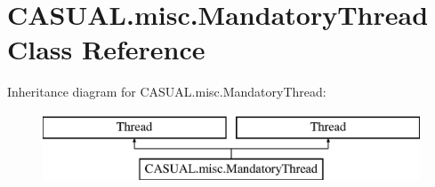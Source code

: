 \hypertarget{class_c_a_s_u_a_l_1_1misc_1_1_mandatory_thread}{\section{C\-A\-S\-U\-A\-L.\-misc.\-Mandatory\-Thread Class Reference}
\label{class_c_a_s_u_a_l_1_1misc_1_1_mandatory_thread}
}
Inheritance diagram for C\-A\-S\-U\-A\-L.\-misc.\-Mandatory\-Thread\-:\begin{figure}[H]
\begin{center}
\leavevmode
\includegraphics[height=2.000000cm]{class_c_a_s_u_a_l_1_1misc_1_1_mandatory_thread}
\end{center}
\end{figure}
